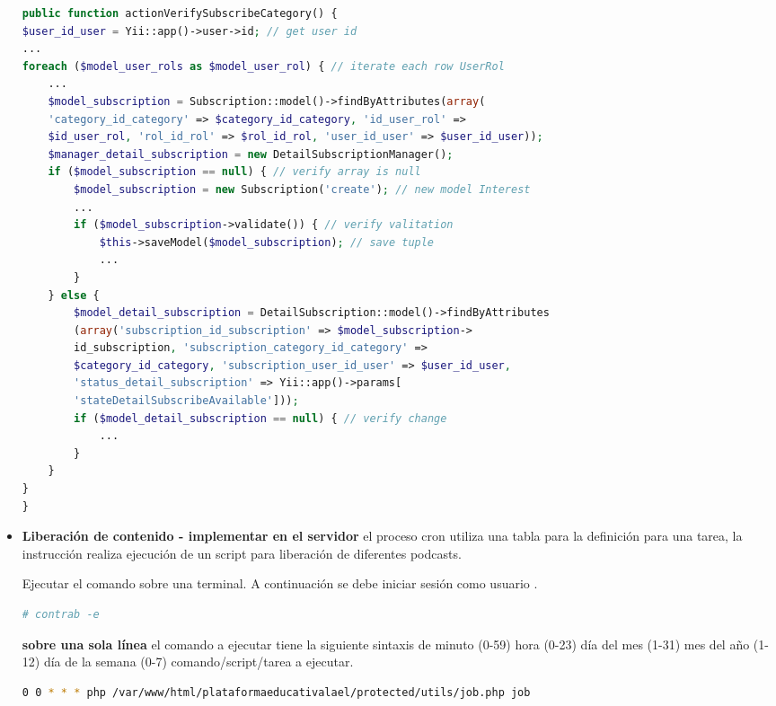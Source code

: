 \begin{itemize}
\begin{lstlisting}[language=PHP, caption={Verificación registro suscripción.}]
public function actionVerifySubscribeCategory() {
$user_id_user = Yii::app()->user->id; // get user id
...
foreach ($model_user_rols as $model_user_rol) { // iterate each row UserRol
    ...
    $model_subscription = Subscription::model()->findByAttributes(array(
    'category_id_category' => $category_id_category, 'id_user_rol' => 
    $id_user_rol, 'rol_id_rol' => $rol_id_rol, 'user_id_user' => $user_id_user));
    $manager_detail_subscription = new DetailSubscriptionManager();
    if ($model_subscription == null) { // verify array is null
        $model_subscription = new Subscription('create'); // new model Interest
        ...
        if ($model_subscription->validate()) { // verify valitation
            $this->saveModel($model_subscription); // save tuple
            ...
        }
    } else {
        $model_detail_subscription = DetailSubscription::model()->findByAttributes
        (array('subscription_id_subscription' => $model_subscription->
        id_subscription, 'subscription_category_id_category' => 
        $category_id_category, 'subscription_user_id_user' => $user_id_user,
        'status_detail_subscription' => Yii::app()->params[
        'stateDetailSubscribeAvailable']));
        if ($model_detail_subscription == null) { // verify change
            ...
        }
    }
}    
}
\end{lstlisting}

\item \textbf{Liberación de contenido - implementar en el servidor} el
proceso cron utiliza una tabla para la definición para una tarea, la
instrucción realiza ejecución de un script para liberación de diferentes
podcasts.

Ejecutar el comando sobre una terminal. A continuación se debe iniciar sesión
como usuario .

\begin{lstlisting}[language=bash, caption={Acceso archivo crontab.}]
# contrab -e
\end{lstlisting}

\textbf{sobre una sola línea} el comando a ejecutar tiene la siguiente sintaxis
de minuto (0-59) hora (0-23) día del mes (1-31) mes del año (1-12) día de la
semana (0-7) comando/script/tarea a ejecutar.

\begin{lstlisting}[language=bash, caption={Comando para ejecución de tarea.}]
0 0 * * * php /var/www/html/plataformaeducativalael/protected/utils/job.php job
\end{lstlisting}


\end{itemize}
